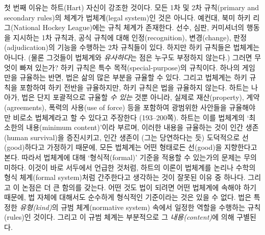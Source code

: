 \documentclass[12pt, oneside]{book}  %
\begin{document}
첫 번째 이유는 하트(Hart) 자신이 강조한 것이다. 모든 1차 및 2차
규칙(primary and secondary rules)의 체계가 법체계(legal system)인 것은
아니다. 예컨대, 북미 하키 리그(National Hockey League)에는 규칙 체계가
존재한다. 선수, 심판, 커미셔너의 행동을 지시하는 1차 규칙과, 공식 규칙에
대해 인정(recognition), 변경(change), 판정(adjudication)의 기능을
수행하는 2차 규칙들이 있다. 하지만 하키 규칙들은 법체계는 아니다. (물론
그것들이 법체계와 \emph{유사하다}는 점은 누구도 부정하지 않는다.) 그러면
무엇이 빠져 있는가? 하키 규칙은 특수 목적(special-purpose)의 규칙이다.
하나의 게임만을 규율하는 반면, 법은 삶의 많은 부분을 규율할 수 있다.
그리고 법체계는 하키 규칙을 포함하여 하키 전반을 규율하지만, 하키 규칙은
법을 규율하지 않는다. 하트는 나아가, 법은 단지 포괄적으로 규율할
\emph{수 있는} 것뿐 아니라, 실제로 재산(property), 계약(agreements),
폭력의 사용(use of force) 등을 포함하여 광범위한 사안들을 규율해야만
비로소 법체계라고 할 수 있다고 주장한다 (193--200쪽). 하트는 이를
법체계의 `최소한의 내용(minimum content)'이라 부르며, 이러한 내용을
규율하는 것이 인간 생존(human survival)을 증진시키고, 인간 생존이 (그는
당연하다는 듯) 도덕적으로 선(good)하다고 가정하기 때문에, 모든 법체계는
어떤 형태로든 선(good)을 지향한다고 본다. 따라서 법체계에 대해
`형식적(formal)' 기준을 적용할 수 있는가의 문제는 무의미하다. 이것이
바로 서두에서 언급한 것처럼, 하트의 이론이 법체계를 논리나 수학의 형식
체계(formal system)처럼 간주한다고 생각하는 것이 잘못된 이유 중 하나다.
그리고 이 논점은 더 큰 함의를 갖는다. 어떤 것도 법이 되려면 어떤
법체계에 속해야 하기 때문에, 법 자체에 대해서도 순수하게 형식적인
기준이라는 것은 있을 수 없다. 법은 특정한 \emph{유형(kind)}의 규범
체계(normative system) 속에서 일정한 역할을 수행하는 규칙(rules)인
것이다. 그리고 이 규범 체계는 부분적으로 그 \emph{내용(content)}에 의해
구별된다.
\end{document}
